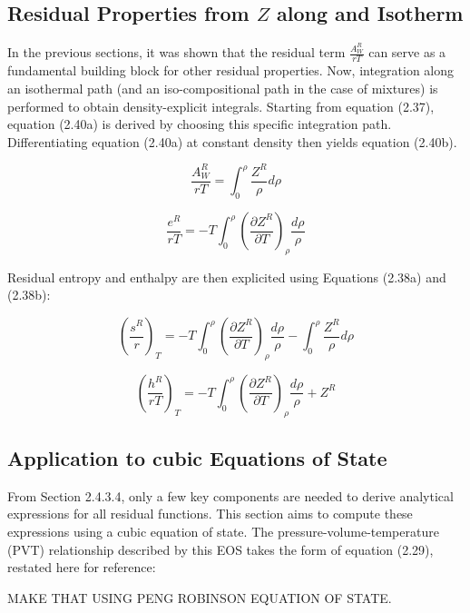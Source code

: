 \subsection{Residual Properties from $Z$ along and Isotherm}

In the previous sections, it was shown that the residual term $\frac{A_W^R}{rT}$ can
serve as a fundamental building block for other residual properties. Now,
integration along an isothermal path (and an iso-compositional path in the case
of mixtures) is performed to obtain density-explicit integrals. Starting from
equation (2.37), equation (2.40a) is derived by choosing this specific
integration path. Differentiating equation (2.40a) at constant density then
yields equation (2.40b).

\begin{equation}
	\frac{A^R_W}{rT} = \int_0^\rho\frac{Z^R}{\rho}d\rho
\end{equation}

\begin{equation}
	\frac{e^R}{rT} = -T\int_0^\rho\left(\frac{\partial Z^R}{\partial T}\right)_\rho\frac{d\rho}{\rho}
\end{equation}

Residual entropy and enthalpy are then explicited using Equations (2.38a) and
(2.38b):

\begin{equation}
	\left(\frac{s^R}{r}\right)_T = -T\int_0^\rho\left(\frac{\partial Z^R}{\partial T}\right)_\rho\frac{d\rho}{\rho} - \int_0^\rho\frac{Z^R}{\rho}d\rho 
\end{equation}

\begin{equation}
	\left(\frac{h^R}{rT}\right)_T = -T\int_0^\rho\left(\frac{\partial Z^R}{\partial T}\right)_\rho\frac{d\rho}{\rho} + Z^R
\end{equation}

\subsection{Application to cubic Equations of State}

From Section 2.4.3.4, only a few key components are needed to derive analytical
expressions for all residual functions. This section aims to compute these
expressions using a cubic equation of state. The pressure-volume-temperature
(PVT) relationship described by this EOS takes the form of equation (2.29),
restated here for reference:

MAKE THAT USING PENG ROBINSON EQUATION OF STATE.

